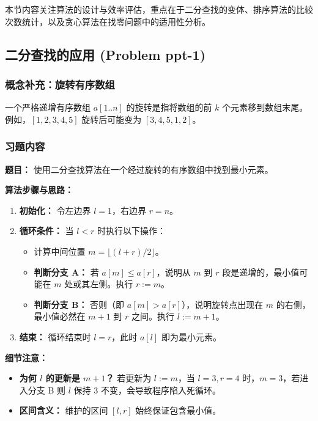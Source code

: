 \documentclass[11pt,UTF8]{article}
\begin{document}
本节内容关注算法的设计与效率评估，重点在于二分查找的变体、排序算法的比较次数统计，以及贪心算法在找零问题中的适用性分析。

\subsection{二分查找的应用 (Problem ppt-1)}

\subsubsection*{概念补充：旋转有序数组}
一个严格递增有序数组 $a[1..n]$ 的旋转是指将数组的前 $k$ 个元素移到数组末尾。例如，$[1, 2, 3, 4, 5]$ 旋转后可能变为 $[3, 4, 5, 1, 2]$。

\subsubsection*{习题内容}
\textbf{题目：} 使用二分查找算法在一个经过旋转的有序数组中找到最小元素。

\textbf{算法步骤与思路：}
\begin{enumerate}[1.]
    \item \textbf{初始化：} 令左边界 $l = 1$，右边界 $r = n$。
    \item \textbf{循环条件：} 当 $l < r$ 时执行以下操作：
    \begin{itemize}
        \item 计算中间位置 $m = \lfloor(l + r) / 2\rfloor$。
        \item \textbf{判断分支 A：} 若 $a[m] \le a[r]$，说明从 $m$ 到 $r$ 段是递增的，最小值可能在 $m$ 处或其左侧。执行 $r := m$。
        \item \textbf{判断分支 B：} 否则（即 $a[m] > a[r]$），说明旋转点出现在 $m$ 的右侧，最小值必然在 $m+1$ 到 $r$ 之间。执行 $l := m + 1$。
    \end{itemize}
    \item \textbf{结束：} 循环结束时 $l = r$，此时 $a[l]$ 即为最小元素。
\end{enumerate}

\textbf{细节注意：}
\begin{itemize}
    \item \textbf{为何 $l$ 的更新是 $m+1$？} 若更新为 $l := m$，当 $l=3, r=4$ 时，$m=3$，若进入分支 B 则 $l$ 保持 3 不变，会导致程序陷入死循环。
    \item \textbf{区间含义：} 维护的区间 $[l, r]$ 始终保证包含最小值。
\end{itemize}
\end{document}
